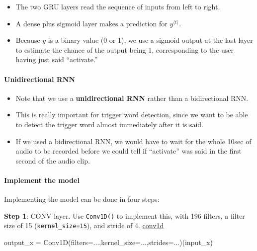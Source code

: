 \documentclass[11pt]{article}
\newenvironment{Shaded}{}{}
\newcommand{\NormalTok}[1]{{#1}}
\begin{document}
\begin{itemize}
\itemsep1pt\parskip0pt
\item
  The two GRU layers read the sequence of inputs from left to right.
\item
  A dense plus sigmoid layer makes a prediction for
  $y^{\langle t \rangle}$.
\item
  Because $y$ is a binary value (0 or 1), we use a sigmoid output at the
  last layer to estimate the chance of the output being 1, corresponding
  to the user having just said ``activate.''
\end{itemize}

\paragraph{Unidirectional RNN}\label{unidirectional-rnn}

\begin{itemize}
\itemsep1pt\parskip0pt
\item
  Note that we use a \textbf{unidirectional RNN} rather than a
  bidirectional RNN.
\item
  This is really important for trigger word detection, since we want to
  be able to detect the trigger word almost immediately after it is
  said.
\item
  If we used a bidirectional RNN, we would have to wait for the whole
  10sec of audio to be recorded before we could tell if ``activate'' was
  said in the first second of the audio clip.
\end{itemize}

    \paragraph{Implement the model}\label{implement-the-model}

Implementing the model can be done in four steps:

\textbf{Step 1}: CONV layer. Use \texttt{Conv1D()} to implement this,
with 196 filters, a filter size of 15 (\texttt{kernel\_size=15}), and
stride of 4.
\href{https://keras.io/layers/convolutional/\#conv1d}{conv1d}

\begin{Shaded}
\begin{Highlighting}[]
\NormalTok{output_x = Conv1D(filters=...,kernel_size=...,strides=...)(input_x)}
\end{Highlighting}
\end{Shaded}
\end{document}
